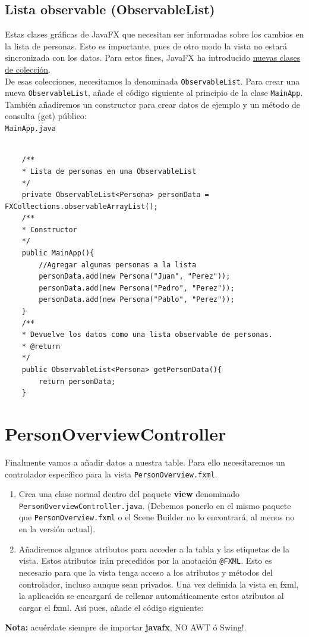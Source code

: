 \subsection{Lista observable (ObservableList)}
Estas clases gráficas de JavaFX que necesitan ser informadas sobre los cambios en la lista de personas. Esto es importante, pues de otro modo la vista no estará sincronizada con los datos. Para estos fines, JavaFX ha introducido \textcolor{azul}{\href{https://docs.oracle.com/javase/8/javafx/collections-tutorial/collections.htm}{nuevas clases de colección}}.\\
De esas colecciones, necesitamos la denominada \textcolor{codigo}{\texttt{ObservableList}}. Para crear una nueva \textcolor{codigo}{\texttt{ObservableList}}, añade el código siguiente al principio de la clase \textcolor{codigo}{\texttt{MainApp}}. También añadiremos un constructor para crear datos de ejemplo y un método de consulta (get) público:\\
\textcolor{codigo}{\texttt{MainApp.java}}
\begin{verbatim}

	/**
	* Lista de personas en una ObservableList
	*/
	private ObservableList<Persona> personData = FXCollections.observableArrayList();
	/**
	* Constructor
	*/
	public MainApp(){
		//Agregar algunas personas a la lista
		personData.add(new Persona("Juan", "Perez"));
		personData.add(new Persona("Pedro", "Perez"));
		personData.add(new Persona("Pablo", "Perez"));
	}
	/**
	* Devuelve los datos como una lista observable de personas.
	* @return
	*/
	public ObservableList<Persona> getPersonData(){
		return personData;
	}
\end{verbatim}
\section{PersonOverviewController}
Finalmente vamos a añadir datos a nuestra table. Para ello necesitaremos un controlador específico para la vista \textcolor{codigo}{\texttt{PersonOverview.fxml}}.
\begin{enumerate}
	\item Crea una clase normal dentro del paquete \textbf{view} denominado \textcolor{codigo}{\texttt{PersonOverviewController.java}}. (Debemos ponerlo en el mismo paquete que \textcolor{codigo}{\texttt{PersonOverview.fxml}} o el Scene Builder no lo encontrará, al menos no en la versión actual).
	\item Añadiremos algunos atributos para acceder a la tabla y las etiquetas de la vista. Estos atributos irán precedidos por la anotación \textcolor{codigo}{\texttt{@FXML}}. Esto es necesario para que la vista tenga acceso a los atributos y métodos del controlador, incluso aunque sean privados. Una vez definida la vista en fxml, la aplicación se encargará de rellenar automáticamente estos atributos al cargar el fxml. Así pues, añade el código siguiente:
\end{enumerate}
\begin{tcolorbox}[leftrule=3mm]
	\textbf{Nota:} acuérdate siempre de importar \textbf{javafx}, NO AWT ó Swing!.
\end{tcolorbox}


